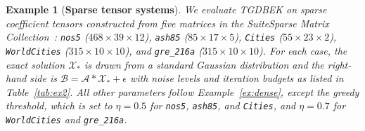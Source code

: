 \documentclass[11pt]{article}
\newtheorem{example}[theorem]{Example}
\def\fm#1{\mathcal{#1}}
\begin{document}
\begin{example}[\textbf{Sparse tensor systems}] \label{ex:sparse}
We evaluate TGDBEK on sparse coefficient tensors constructed from five matrices in the SuiteSparse Matrix Collection~\cite{suiteSparse}: \texttt{nos5} ($468\times39\times12$), \texttt{ash85} ($85\times17\times5$), \texttt{Cities} ($55\times23\times2$), \texttt{WorldCities} ($315\times10\times10$), and \texttt{gre\_216a} ($315\times10\times10$). For each case, the exact solution $\fm X_\ast$ is drawn from a standard Gaussian distribution and the right-hand side is $\fm B = \fm A * \fm X_\ast + \fm\epsilon$ with noise levels and iteration budgets as listed in Table~\ref{tab:ex2}. All other parameters follow Example~\ref{ex:dense}, except the greedy threshold, which is set to $\eta=0.5$ for \texttt{nos5}, \texttt{ash85}, and \texttt{Cities}, and $\eta=0.7$ for \texttt{WorldCities} and \texttt{gre\_216a}.


\end{example}
\end{document}
